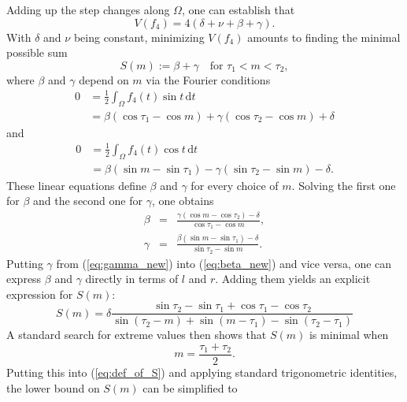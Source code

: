 \documentclass{article}
\newcommand{\dt}{\,\mathrm{d}t}
\begin{document}
Adding up the step changes along $\Omega$, one can establish that 
\begin{equation} \label{eq:total_var_f4}
    V(f_4) = 4(\delta + \nu + \beta + \gamma).
\end{equation}
With $\delta$ and $\nu$ being constant, minimizing $V(f_4)$ amounts to finding the minimal possible sum
\begin{equation*}
    S(m) := \beta + \gamma \quad \text{for } \tau_1 < m < \tau_2,
\end{equation*}
where $\beta$ and $\gamma$ depend on $m$ via the Fourier conditions
\begin{align*}
    0 &= \frac 12 \int_\Omega f_4(t) \sin t \dt\\
    &=  \beta (\cos\tau_1- \cos m) + \gamma(\cos \tau_2 -\cos m) + \delta
\end{align*}
and
\begin{align*}
    0 &= \frac 12 \int_\Omega f_4(t) \cos t \dt \\
    &= \beta (\sin m-\sin\tau_1) -\gamma(\sin\tau_2 - \sin m) - \delta.
\end{align*}
These linear equations define $\beta$ and $\gamma$ for every choice of $m$. Solving the first one for $\beta$ and the second one for $\gamma$, one obtains
\begin{eqnarray}
    \beta &=& \frac{\gamma(\cos m-\cos\tau_2) - \delta}{\cos\tau_1- \cos m}, \label{eq:beta_new}\\
    \gamma &=& \frac{\beta (\sin m-\sin\tau_1)- \delta}{\sin\tau_2 - \sin m}.\label{eq:gamma_new}
\end{eqnarray}
Putting $\gamma$ from (\ref{eq:gamma_new}) into (\ref{eq:beta_new}) and vice versa, one can express $\beta$ and $\gamma$ directly in terms of $l$ and $r$. Adding them yields an explicit expression for $S(m)$:
\begin{equation} \label{eq:def_of_S}
     S(m) = \delta\frac{\sin\tau_2-\sin\tau_1+\cos\tau_1-\cos\tau_2}{ \sin(\tau_2-m) + \sin(m-\tau_1) - \sin(\tau_2-\tau_1)}
\end{equation}
A standard search for extreme values then shows that $S(m)$ is minimal when
\[m = \frac{\tau_1+\tau_2}{2}.\]
Putting this into (\ref{eq:def_of_S}) and applying standard trigonometric identities, the lower bound on $S(m)$ can be simplified to
\end{document}
